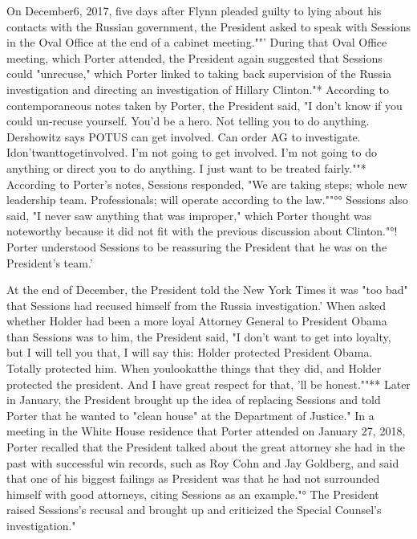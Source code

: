 On December6, 2017, five days after Flynn pleaded guilty to lying about his contacts with the Russian government, the President asked to speak with Sessions in the Oval Office at the end of a cabinet meeting.""'
During that Oval Office meeting, which Porter attended, the President again suggested that Sessions could "unrecuse," which Porter linked to taking back supervision of the Russia investigation and directing an investigation of Hillary Clinton."*
According to contemporaneous notes taken by Porter, the President said, "I don't know if you could un-recuse yourself.
You'd be a hero.
Not telling you to do anything.
Dershowitz says POTUS can get involved.
Can order AG to investigate.
Idon'twanttogetinvolved.
I'm not going to get involved.
I'm not going to do anything or direct you to do anything.
I just want to be treated fairly.""*
According to Porter's notes, Sessions responded, "We are taking steps; whole new leadership team.
Professionals; will operate according to the law.""°°
Sessions also said, "I never saw anything that was improper," which Porter thought was noteworthy because it did not fit with the previous discussion about Clinton."°!
Porter understood Sessions to be reassuring the President that he was on the President's team.'

At the end of December, the President told the New York Times it was "too bad" that Sessions had recused himself from the Russia investigation.'
When asked whether Holder had been a more loyal Attorney General to President Obama than Sessions was to him, the President said, "I don't want to get into loyalty, but I will tell you that, I will say this: Holder protected President Obama.
Totally protected him.
When youlookatthe things that they did, and Holder protected the president.
And I have great respect for that, 'll be honest.""** Later in January, the President brought up the idea of replacing Sessions and told Porter that he wanted to "clean house" at the Department of Justice."
In a meeting in the White House residence that Porter attended on January 27, 2018, Porter recalled that the President talked about the great attorney she had in the past with successful win records, such as Roy Cohn and Jay Goldberg, and said that one of his biggest failings as President was that he had not surrounded himself with good attorneys, citing Sessions as an example."°
The President raised Sessions's recusal and brought up and criticized the Special Counsel's investigation."

